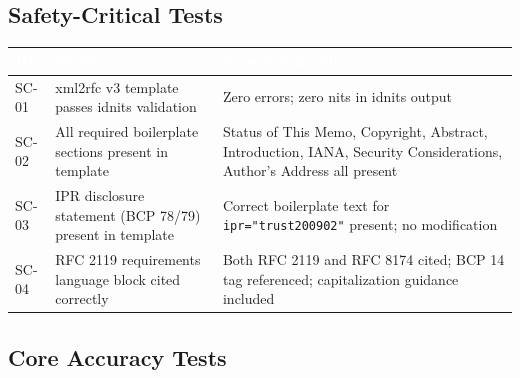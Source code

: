 \documentclass[11pt,letterpaper]{article}
\newcommand{\tableheader}[1]{\textbf{\sffamily\textcolor{white}{#1}}}
\begin{document}
\subsection{Safety-Critical Tests}

\begin{center}
\begin{tabularx}{\textwidth}{L{1.5cm}L{4cm}X}
\toprule
{}
\tableheader{ID} & \tableheader{Verifies} & \tableheader{Expected Result} \\
\midrule
SC-01 & xml2rfc v3 template passes idnits validation & Zero errors; zero nits in idnits output \\
SC-02 & All required boilerplate sections present in template & Status of This Memo, Copyright, Abstract, Introduction, IANA, Security Considerations, Author's Address all present \\
SC-03 & IPR disclosure statement (BCP 78/79) present in template & Correct boilerplate text for \texttt{ipr="trust200902"} present; no modification \\
SC-04 & RFC 2119 requirements language block cited correctly & Both RFC 2119 and RFC 8174 cited; BCP 14 tag referenced; capitalization guidance included \\
\bottomrule
\end{tabularx}
\end{center}

\subsection{Core Accuracy Tests}
\end{document}
